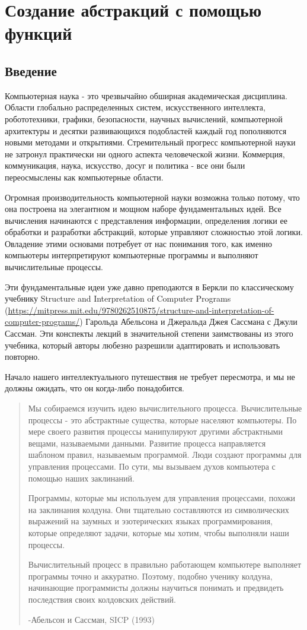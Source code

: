 \section{Создание абстракций с помощью функций}
\subsection{Введение}

Компьютерная наука - это чрезвычайно обширная академическая дисциплина. Области глобально распределенных систем, искусственного интеллекта, робототехники, графики, безопасности, научных вычислений, компьютерной архитектуры и десятки развивающихся подобластей каждый год пополняются новыми методами и открытиями. Стремительный прогресс компьютерной науки не затронул практически ни одного аспекта человеческой жизни. Коммерция, коммуникация, наука, искусство, досуг и политика - все они были переосмыслены как компьютерные области.

Огромная производительность компьютерной науки возможна только потому, что она построена на элегантном и мощном наборе фундаментальных идей. Все вычисления начинаются с представления информации, определения логики ее обработки и разработки абстракций, которые управляют сложностью этой логики. Овладение этими основами потребует от нас понимания того, как именно компьютеры интерпретируют компьютерные программы и выполняют вычислительные процессы.

Эти фундаментальные идеи уже давно преподаются в Беркли по классическому учебнику Structure and Interpretation of Computer Programs (\url{https://mitpress.mit.edu/9780262510875/structure-and-interpretation-of-computer-programs/}) Гарольда Абельсона и Джеральда Джея Сассмана с Джули Сассман. Эти конспекты лекций в значительной степени заимствованы из этого учебника, который авторы любезно разрешили адаптировать и использовать повторно.

Начало нашего интеллектуального путешествия не требует пересмотра, и мы не должны ожидать, что он когда-либо понадобится.


\begin{quotation}
Мы собираемся изучить идею вычислительного процесса. Вычислительные процессы - это абстрактные существа, которые населяют компьютеры. По мере своего развития процессы манипулируют другими абстрактными вещами, называемыми данными. Развитие процесса направляется шаблоном правил, называемым программой. Люди создают программы для управления процессами. По сути, мы вызываем духов компьютера с помощью наших заклинаний.

Программы, которые мы используем для управления процессами, похожи на заклинания колдуна. Они тщательно составляются из символических выражений на заумных и эзотерических языках программирования, которые определяют задачи, которые мы хотим, чтобы выполняли наши процессы.

Вычислительный процесс в правильно работающем компьютере выполняет программы точно и аккуратно. Поэтому, подобно ученику колдуна, начинающие программисты должны научиться понимать и предвидеть последствия своих колдовских действий.

-Абельсон и Сассман, SICP (1993)
\end{quotation}

